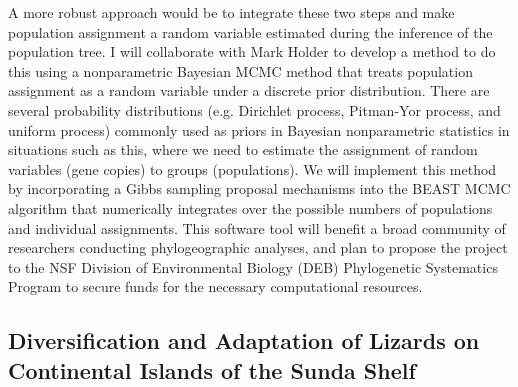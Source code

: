 \documentclass[10pt]{article}
\begin{document}
A more robust approach would be to integrate these two steps and make population assignment a random variable estimated during the inference of the population tree.
I will collaborate with Mark Holder to develop a method to do this using a nonparametric Bayesian MCMC method that treats population assignment as a random variable under a discrete prior distribution.
There are several probability distributions (e.g. Dirichlet process, Pitman-Yor process, and uniform process) commonly used as priors in Bayesian nonparametric statistics in situations such as this, where we need to estimate the assignment of random variables (gene copies) to groups (populations).
We will implement this method by incorporating a Gibbs sampling proposal mechanisms into the BEAST MCMC algorithm that numerically integrates over the possible numbers of populations and individual assignments.
This software tool will benefit a broad community of researchers conducting phylogeographic analyses, and plan to propose the project to the NSF Division of Environmental Biology (DEB) Phylogenetic Systematics Program to secure funds for the necessary computational resources.

\subsection*{Diversification and Adaptation of Lizards on Continental Islands of the Sunda Shelf}
\end{document}
